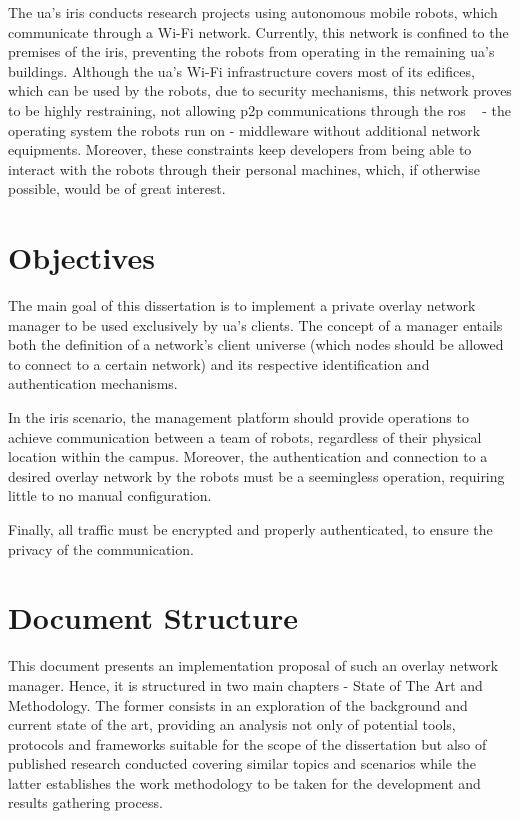 \documentclass[11pt,twoside,a4paper]{report}
\begin{document}
The \acrfull{ua}'s \acrfull{iris} conducts research projects using autonomous mobile robots, which communicate through a Wi-Fi network. Currently, this network is confined to the premises of the \acrshort{iris}, preventing the robots from operating in the remaining \acrshort{ua}'s buildings. Although the \acrshort{ua}'s Wi-Fi infrastructure covers most of its edifices, which can be used by the robots, due to security mechanisms, this network proves to be highly restraining, not allowing \acrfull{p2p} communications through the \acrfull{ros} ~\cite{quigley2009ros} - the operating system the robots run on - middleware without additional network equipments. Moreover, these constraints keep developers from being able to interact with the robots through their personal machines, which, if otherwise possible, would be of great interest.

\section{Objectives}

The main goal of this dissertation is to implement a private overlay network manager to be used exclusively by \acrshort{ua}'s clients. The concept of a manager entails both the definition of a network's client universe (which nodes should be allowed to connect to a certain network) and its respective identification and authentication mechanisms.

In the \acrshort{iris} scenario, the management platform should provide operations to achieve communication between a team of robots, regardless of their physical location within the campus. Moreover, the authentication and connection to a desired overlay network by the robots must be a seemingless operation, requiring little to no manual configuration.

Finally, all traffic must be encrypted and properly authenticated, to ensure the privacy of the communication.

\section{Document Structure}

This document presents an implementation proposal of such an overlay network manager. Hence, it is structured in two main chapters - State of The Art and Methodology. The former consists in an exploration of the background and current state of the art, providing an analysis not only of potential tools, protocols and frameworks suitable for the scope of the dissertation but also of published research conducted covering similar topics and scenarios while the latter establishes the work methodology to be taken for the development and results gathering process.
\end{document}
